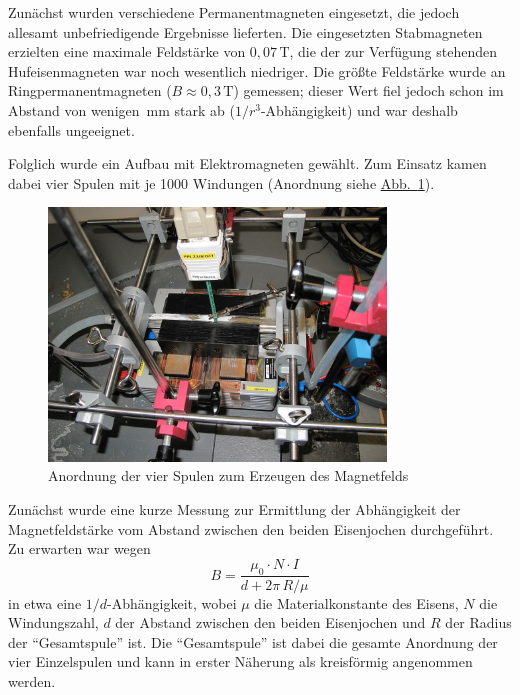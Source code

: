 \documentclass[11pt]{scrartcl}
\newcommand{\unit}[1]{\ensuremath{\,\mathrm{#1}}} %
\newcommand{\abb}[1]{\hyperref[#1]{Abb.~\ref{#1}}}
\begin{document}
Zunächst wurden verschiedene Permanentmagneten eingesetzt, die jedoch allesamt unbefriedigende Ergebnisse lieferten. Die eingesetzten Stabmagneten erzielten eine maximale Feldstärke von $0,07\unit{T}$, die der zur Verfügung stehenden Hufeisenmagneten war noch wesentlich niedriger. Die größte Feldstärke wurde an Ringpermanentmagneten ($B\approx0,3\unit{T}$) gemessen; dieser Wert fiel jedoch schon im Abstand von wenigen $\unit{mm}$ stark ab ($1/r^3$-Abhängigkeit) und war deshalb ebenfalls ungeeignet.

Folglich wurde ein Aufbau mit Elektromagneten gewählt. Zum Einsatz kamen dabei vier Spulen mit je 1000 Windungen (Anordnung siehe \abb{Spulenanordnung}).

\begin{figure}[ht]
\begin{center}
\includegraphics[width=0.8\textwidth]{images/bfeld-vor2.jpg}
\end{center}
\vspace{-1.5\baselineskip}
\caption{Anordnung der vier Spulen zum Erzeugen des Magnetfelds}
\label{Spulenanordnung}
\end{figure}

Zunächst wurde eine kurze Messung zur Ermittlung der Abhängigkeit der Magnetfeldstärke vom Abstand zwischen den beiden Eisenjochen
durchgeführt. Zu erwarten war wegen 
\begin{equation}
B = \frac{\mu_{0} \cdot N \cdot I}{d + 2 \pi \, R / \mu}
\end{equation}
in etwa eine $1/d$-Abhängigkeit, wobei $\mu$ die Materialkonstante des Eisens, $N$ die Windungszahl, $d$ der Abstand zwischen den beiden Eisenjochen und $R$ der Radius der "`Gesamtspule"' ist. Die "`Gesamtspule"' ist dabei die gesamte Anordnung der vier Einzelspulen und kann in erster Näherung als kreisförmig angenommen werden.
\end{document}
